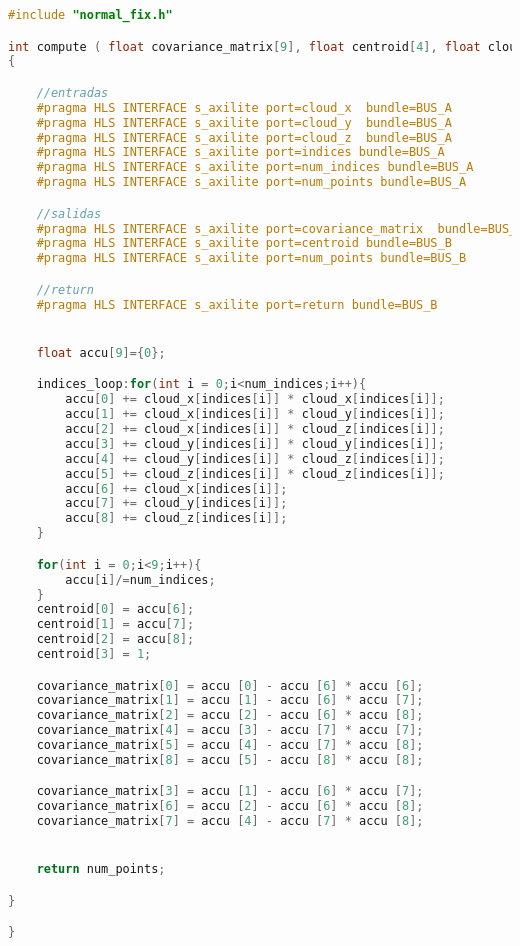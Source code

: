  \begin{lstlisting}[language=C++,breaklines]
 #include "normal_fix.h"

int compute ( float covariance_matrix[9], float centroid[4], float cloud_x[MAXPOINTS], float cloud_y[MAXPOINTS], float cloud_z[MAXPOINTS],int indices[MAXINDICES], int num_points, int num_indices)
{

	//entradas
	#pragma HLS INTERFACE s_axilite port=cloud_x  bundle=BUS_A
	#pragma HLS INTERFACE s_axilite port=cloud_y  bundle=BUS_A
	#pragma HLS INTERFACE s_axilite port=cloud_z  bundle=BUS_A
	#pragma HLS INTERFACE s_axilite port=indices bundle=BUS_A
	#pragma HLS INTERFACE s_axilite port=num_indices bundle=BUS_A
	#pragma HLS INTERFACE s_axilite port=num_points bundle=BUS_A

	//salidas
	#pragma HLS INTERFACE s_axilite port=covariance_matrix  bundle=BUS_B
	#pragma HLS INTERFACE s_axilite port=centroid bundle=BUS_B
	#pragma HLS INTERFACE s_axilite port=num_points bundle=BUS_B

	//return
	#pragma HLS INTERFACE s_axilite port=return bundle=BUS_B


	float accu[9]={0};

	indices_loop:for(int i = 0;i<num_indices;i++){
		accu[0] += cloud_x[indices[i]] * cloud_x[indices[i]];
		accu[1] += cloud_x[indices[i]] * cloud_y[indices[i]];
		accu[2] += cloud_x[indices[i]] * cloud_z[indices[i]];
		accu[3] += cloud_y[indices[i]] * cloud_y[indices[i]];
		accu[4] += cloud_y[indices[i]] * cloud_z[indices[i]];
		accu[5] += cloud_z[indices[i]] * cloud_z[indices[i]];
		accu[6] += cloud_x[indices[i]];
		accu[7] += cloud_y[indices[i]];
		accu[8] += cloud_z[indices[i]];
	}

	for(int i = 0;i<9;i++){
		accu[i]/=num_indices;
	}
	centroid[0] = accu[6];
	centroid[1] = accu[7];
	centroid[2] = accu[8];
	centroid[3] = 1;

	covariance_matrix[0] = accu [0] - accu [6] * accu [6];
	covariance_matrix[1] = accu [1] - accu [6] * accu [7];
	covariance_matrix[2] = accu [2] - accu [6] * accu [8];
	covariance_matrix[4] = accu [3] - accu [7] * accu [7];
	covariance_matrix[5] = accu [4] - accu [7] * accu [8];
	covariance_matrix[8] = accu [5] - accu [8] * accu [8];

	covariance_matrix[3] = accu [1] - accu [6] * accu [7];
	covariance_matrix[6] = accu [2] - accu [6] * accu [8];
	covariance_matrix[7] = accu [4] - accu [7] * accu [8];


	return num_points;

}

}
\end{lstlisting}

